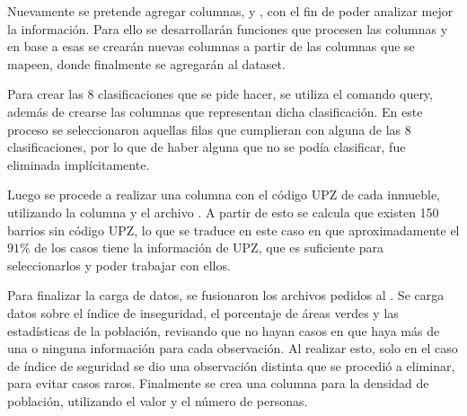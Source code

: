 Nuevamente se pretende agregar columnas,  y , con el fin de poder analizar mejor la información. Para ello se desarrollarán funciones que procesen las columnas  y en base a esas se crearán nuevas columnas a partir de las columnas que se mapeen, donde finalmente se agregarán al dataset.

Para crear las 8 clasificaciones que se pide hacer, se utiliza el comando query, además de crearse las columnas que representan dicha clasificación. En este proceso se seleccionaron aquellas filas que cumplieran con alguna de las 8 clasificaciones, por lo que de haber alguna que no se podía clasificar, fue eliminada implícitamente.

Luego se procede a realizar una columna con el código UPZ de cada inmueble, utilizando la columna  y el archivo . A partir de esto se calcula que existen 150 barrios sin código UPZ, lo que se traduce en este caso en que aproximadamente el $91\%$ de los casos tiene la información de UPZ, que es suficiente para seleccionarlos y poder trabajar con ellos.

Para finalizar la carga de datos, se fusionaron los archivos pedidos al . Se carga datos sobre el índice de inseguridad, el porcentaje de áreas verdes y las estadísticas de la población, revisando que no hayan casos en que haya más de una o ninguna información para cada observación. Al realizar esto, solo en el caso de índice de seguridad se dio una observación distinta que se procedió a eliminar, para evitar casos raros. Finalmente se crea una columna para la densidad de población, utilizando el valor  y el número de personas.